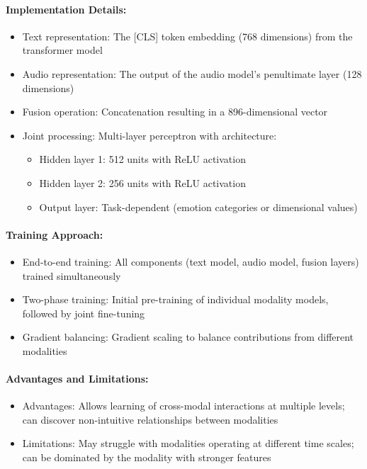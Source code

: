 \documentclass[12pt]{article}
\begin{document}
\paragraph{Implementation Details:}
\begin{itemize}
    \item Text representation: The [CLS] token embedding (768 dimensions) from the transformer model
    \item Audio representation: The output of the audio model's penultimate layer (128 dimensions)
    \item Fusion operation: Concatenation resulting in a 896-dimensional vector
    \item Joint processing: Multi-layer perceptron with architecture:
    \begin{itemize}
        \item Hidden layer 1: 512 units with ReLU activation
        \item Hidden layer 2: 256 units with ReLU activation
        \item Output layer: Task-dependent (emotion categories or dimensional values)
    \end{itemize}
\end{itemize}

\paragraph{Training Approach:}
\begin{itemize}
    \item End-to-end training: All components (text model, audio model, fusion layers) trained simultaneously
    \item Two-phase training: Initial pre-training of individual modality models, followed by joint fine-tuning
    \item Gradient balancing: Gradient scaling to balance contributions from different modalities
\end{itemize}

\paragraph{Advantages and Limitations:}
\begin{itemize}
    \item Advantages: Allows learning of cross-modal interactions at multiple levels; can discover non-intuitive relationships between modalities
    \item Limitations: May struggle with modalities operating at different time scales; can be dominated by the modality with stronger features
\end{itemize}
\end{document}
